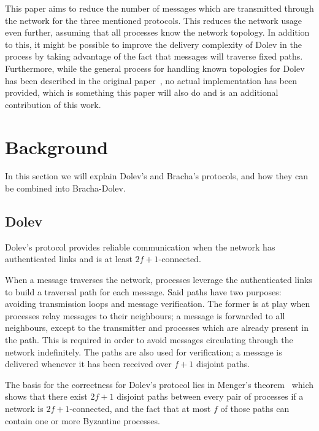 

This paper aims to reduce the number of messages which are transmitted through the network for the three mentioned protocols. This reduces the network usage even further, assuming that all processes know the network topology. In addition to this, it might be possible to improve the delivery complexity of Dolev in the process by taking advantage of the fact that messages will traverse fixed paths. Furthermore, while the general process for handling known topologies for Dolev has been described in the original paper~\cite{dolev}, no actual implementation has been provided, which is something this paper will also do and is an additional contribution of this work.


\section{Background}
\label{background}
In this section we will explain Dolev's and Bracha's protocols, and how they can be combined into Bracha-Dolev.

\subsection*{Dolev}
Dolev's protocol provides reliable communication when the network has authenticated links and is at least $2f+1$-connected.

When a message traverses the network, processes leverage the authenticated links to build a traversal path for each message. Said paths have two purposes: avoiding transmission loops and message verification. 
The former is at play when processes relay messages to their neighbours; a message is forwarded to all neighbours, except to the transmitter and processes which are already present in the path. This is required in order to avoid messages circulating through the network indefinitely.
The paths are also used for verification; a message is delivered whenever it has been received over $f+1$ disjoint paths.

The basis for the correctness for Dolev's protocol lies in Menger's theorem~\cite{menger} which shows that there exist $2f+1$ disjoint paths between every pair of processes if a network is $2f+1$-connected, and the fact that at most $f$ of those paths can contain one or more Byzantine processes. 

